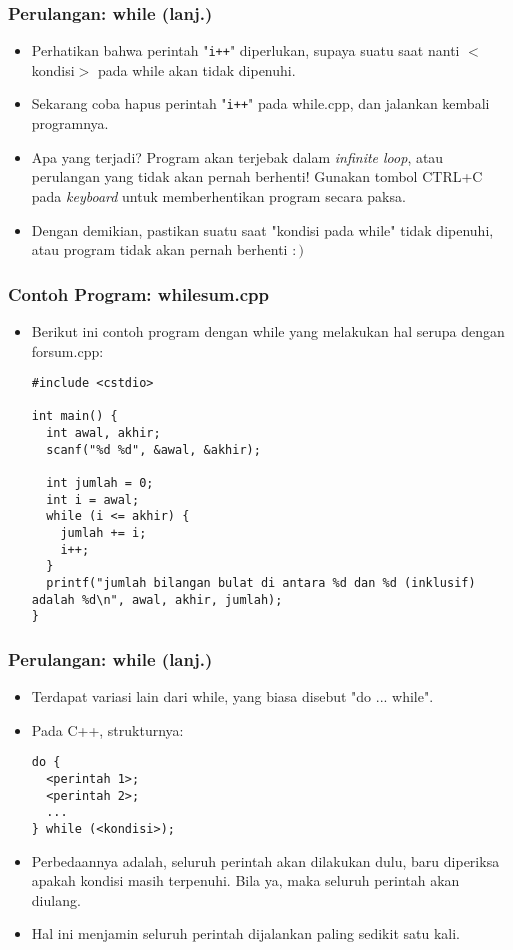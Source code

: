 \begin{frame}
\frametitle{Perulangan: while (lanj.)}
\begin{itemize}
  \item Perhatikan bahwa perintah "\texttt{i++}" diperlukan, supaya suatu saat nanti $<$kondisi$>$ pada while akan tidak dipenuhi.
  \item Sekarang coba hapus perintah "\texttt{i++}" pada while.cpp, dan jalankan kembali programnya.
  \item Apa yang terjadi? Program akan terjebak dalam \alert{\textit{infinite loop}}, atau \alert{perulangan yang tidak akan pernah berhenti}! Gunakan tombol CTRL+C pada \textit{keyboard} untuk memberhentikan program secara paksa.
  \item Dengan demikian, pastikan suatu saat "kondisi pada while" tidak dipenuhi, atau program tidak akan pernah berhenti $:)$
\end{itemize}
\end{frame}

\begin{frame}[fragile]
\frametitle{Contoh Program: whilesum.cpp}
\begin{itemize}
  \item Berikut ini contoh program dengan while yang melakukan hal serupa dengan forsum.cpp:
\begin{lstlisting}
#include <cstdio>

int main() {
  int awal, akhir;
  scanf("%d %d", &awal, &akhir);

  int jumlah = 0;
  int i = awal;
  while (i <= akhir) {
    jumlah += i;
    i++;
  }
  printf("jumlah bilangan bulat di antara %d dan %d (inklusif) adalah %d\n", awal, akhir, jumlah);
}
\end{lstlisting}
\end{itemize}
\end{frame}

\begin{frame}[fragile]
\frametitle{Perulangan: while (lanj.)}
\begin{itemize}
  \item Terdapat variasi lain dari while, yang biasa disebut "do ... while".
  \item Pada C++, strukturnya:
\begin{lstlisting}
do {
  <perintah 1>;
  <perintah 2>;
  ...
} while (<kondisi>);
\end{lstlisting}
  \item Perbedaannya adalah, seluruh perintah akan dilakukan dulu, baru diperiksa apakah kondisi masih terpenuhi. Bila ya, maka seluruh perintah akan diulang.
  \item Hal ini menjamin seluruh perintah dijalankan paling sedikit satu kali.  
\end{itemize}
\end{frame}

